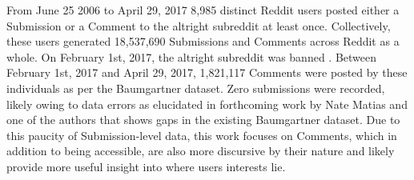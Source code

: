 \documentclass[letterpaper,12pt]{article}
\begin{document}
From June 25 2006 to April 29, 2017 8,985 distinct Reddit users posted either a Submission or a Comment to the altright subreddit at least once. Collectively, these users generated 18,537,690 Submissions and Comments across Reddit as a whole. On February 1st, 2017, the altright subreddit was banned \cite{altright2017banned}. Between February 1st, 2017 and April 29, 2017, 1,821,117 Comments were posted by these individuals as per the Baumgartner dataset. Zero submissions were recorded, likely owing to data errors as elucidated in forthcoming work by Nate Matias and one of the authors that shows gaps in the existing Baumgartner dataset. Due to this paucity of Submission-level data, this work focuses on Comments, which in addition to being accessible, are also more discursive by their nature and likely provide more useful insight into where users interests lie.


\clearpage
\end{document}
